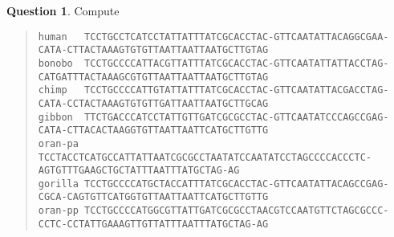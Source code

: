 \documentclass{article}[10pt]
\theoremstyle{definition}\newtheorem{question}{Question}
\begin{document}
%


\begin{question}
Compute
\begin{quote}
\footnotesize\verb|human   TCCTGCCTCATCCTATTATTTATCGCACCTAC-GTTCAATATTACAGGCGAA-CATA-CTTACTAAAGTGTGTTAATTAATTAATGCTTGTAG|\\
\footnotesize\verb|bonobo  TCCTGCCCCATTACGTTATTTATCGCACCTAC-GTTCAATATTATTACCTAG-CATGATTTACTAAAGCGTGTTAATTAATTAATGCTTGTAG|\\
\footnotesize\verb|chimp   TCCTGCCCCATTGTATTATTTATCGCACCTAC-GTTCAATATTACGACCTAG-CATA-CCTACTAAAGTGTGTTGATTAATTAATGCTTGCAG|\\
\footnotesize\verb|gibbon  TTCTGACCCATCCTATTGTTGATCGCGCCTAC-GTTCAATATCCCAGCCGAG-CATA-CTTACACTAAGGTGTTAATTAATTCATGCTTGTTG|\\
\footnotesize\verb|oran-pa TCCTACCTCATGCCATTATTAATCGCGCCTAATATCCAATATCCTAGCCCCACCCTC-AGTGTTTGAAGCTGCTATTTAATTTATGCTAG-AG|\\
\footnotesize\verb|gorilla TCCTGCCCCATGCTACCATTTATCGCACCTAC-GTTCAATATTACAGCCGAG-CGCA-CAGTGTTCATGGTGTTAATTAATTCATGCTTGTTG|\\
\footnotesize\verb|oran-pp TCCTGCCCCATGGCGTTATTGATCGCGCCTAACGTCCAATGTTCTAGCGCCC-CCTC-CCTATTGAAAGTTGTTATTTAATTTATGCTAG-AG|\\
\end{quote}
\end{question}
\end{document}
